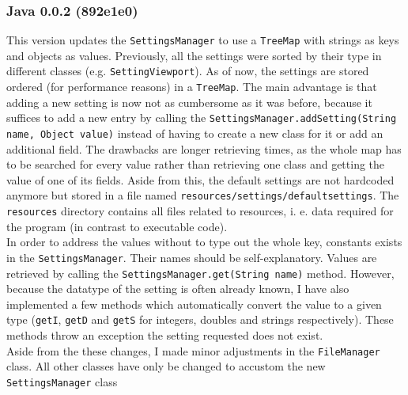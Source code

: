\documentclass[10pt,a4paper,titlepage]{article}
\begin{document}
	\subsubsection{Java 0.0.2 (892e1e0)}
	This version updates the \verb|SettingsManager| to use a \verb|TreeMap| with strings as keys and objects as values. Previously, all the settings were sorted by their type in different classes (e.g. \verb|SettingViewport|). As of now, the settings are stored ordered (for performance reasons) in a \verb|TreeMap|. The main advantage is that adding a new setting is now not as cumbersome as it was before, because it suffices to add a new entry by calling the \verb|SettingsManager.addSetting(String name, Object value)| instead of having to create a new class for it or add an additional field. The drawbacks are longer retrieving times, as the whole map has to be searched for every value rather than retrieving one class and getting the value of one of its fields. Aside from this, the default settings are not hardcoded anymore but stored in a file named \verb|resources/settings/defaultsettings|. The \verb|resources| directory contains all files related to resources, i. e. data required for the program (in contrast to executable code).\\
	In order to address the values without to type out the whole key, constants exists in the \verb|SettingsManager|. Their names should be self-explanatory. Values are retrieved by calling the \verb|SettingsManager.get(String name)| method. However, because the datatype of the setting is often already known, I have also implemented a few methods which automatically convert the value to a given type (\verb|getI|, \verb|getD| and \verb|getS| for integers, doubles and strings respectively). These methods throw an exception the setting requested does not exist.\\
	Aside from the these changes, I made minor adjustments in the \verb|FileManager| class. All other classes have only be changed to accustom the new \verb|SettingsManager| class

	\printbibliography
\end{document}
